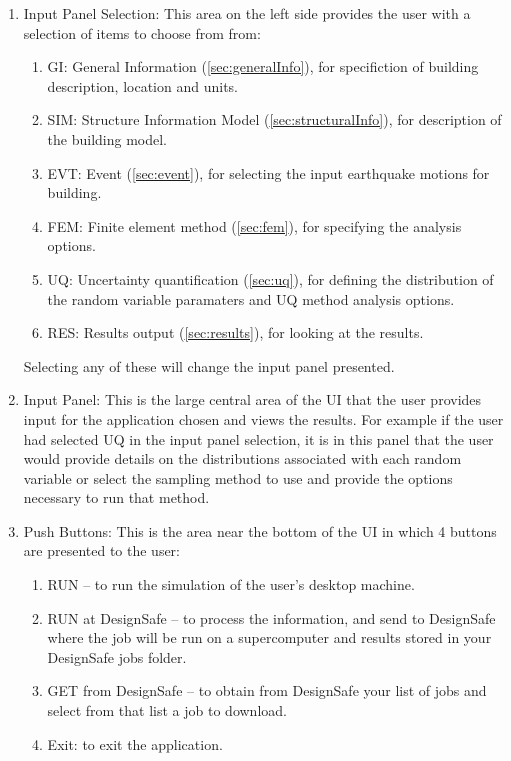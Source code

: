 \begin{enumerate}
\item Input Panel Selection: This area on the left side provides the
  user with a selection of items to choose from from:
\begin{enumerate}
  \item GI: General Information (\ref{sec:generalInfo}), for specifiction of building
    description, location and units.
  \item SIM: Structure Information Model (\ref{sec:structuralInfo}), for description of the
    building model.
  \item EVT: Event (\ref{sec:event}), for selecting the input earthquake motions for building.
  \item FEM: Finite element method (\ref{sec:fem}), for specifying the analysis options.
  \item UQ: Uncertainty quantification (\ref{sec:uq}), for defining the distribution
    of the random variable paramaters and UQ method analysis options.


  \item RES: Results output (\ref{sec:results}), for looking at the results.
\end{enumerate}

Selecting any of these will change the input panel presented.

\item Input Panel: This is the large central area of the UI that the
  user provides input for the application chosen and views the
  results. For example if the user had selected UQ in the input panel
  selection, it is in this panel that the user would provide details
  on the distributions associated with each random variable or select
  the sampling method to use and provide the options necessary to run
  that method.

\item Push Buttons: This is the area near the bottom of the UI in
  which 4 buttons are presented to the user:

\begin{enumerate}
\item RUN – to run the simulation of the user’s desktop machine.
\item RUN at DesignSafe – to process the information, and send to
  DesignSafe where the job will be run on a supercomputer and results
  stored in your DesignSafe jobs folder.
\item GET from DesignSafe – to obtain from DesignSafe your list of
  jobs and select from that list a job to download.
\item Exit: to exit the application.
\end{enumerate}


\end{enumerate}

